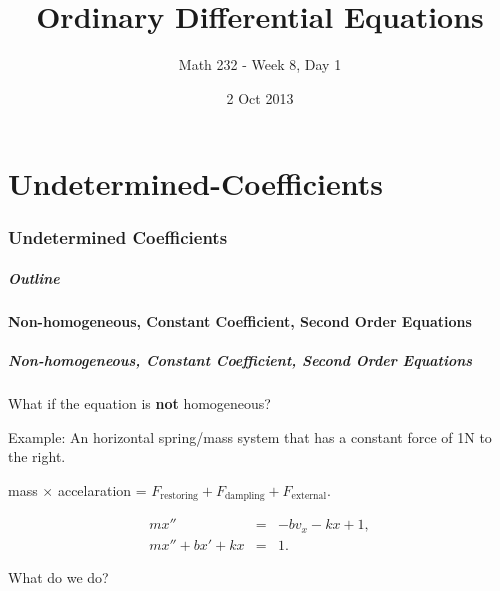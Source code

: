 \part{Undetermined-Coefficients}
\section{Undetermined Coefficients}

\title{Ordinary Differential Equations}
\subtitle{Math 232 - Week 8, Day 1}
\date{2 Oct 2013}

\begin{frame}
  \titlepage
\end{frame}

\begin{frame}
  \frametitle{Outline}
  \tableofcontents[ currentsection ]
\end{frame}


\subsection{Non-homogeneous, Constant Coefficient, Second Order Equations}


\begin{frame}
  \frametitle{Non-homogeneous, Constant Coefficient, Second Order
    Equations}
  What if the equation is \textbf{not} homogeneous?

  Example: An horizontal spring/mass system that has a constant force
  of 1N to the right.

  \begin{center}
    mass $\times$ accelaration = $F_{\text{restoring}} + F_{\text{dampling}}
   + F_{\text{external}}.$
  \end{center}
  \begin{eqnarray*}
    m x'' & = & -b v_x - kx + 1, \\
    m x'' + bx' + kx & = & 1.
  \end{eqnarray*}

  What do we do?


\end{frame}


%
%


